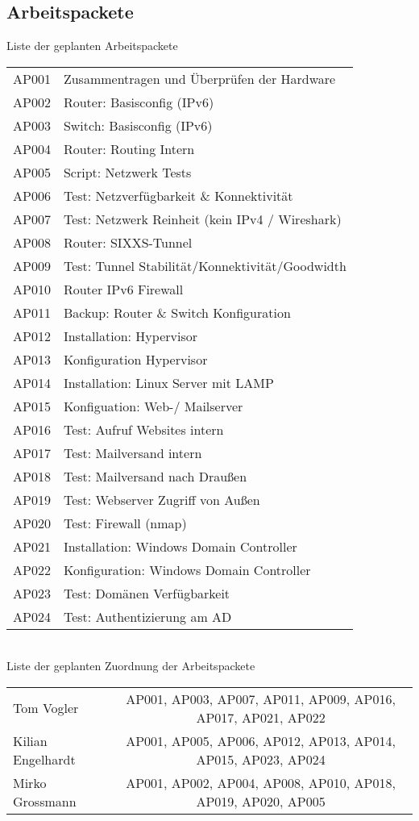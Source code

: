 \subsection{Arbeitspackete}
Liste der geplanten Arbeitspackete\\
\noindent \begin{tabular}{|l|l|}
\hline
AP001 & Zusammentragen und Überprüfen der Hardware \\
AP002 & Router: Basisconfig (IPv6) \\
AP003 & Switch: Basisconfig (IPv6) \\
AP004 & Router: Routing Intern \\
AP005 & Script: Netzwerk Tests \\
AP006 & Test: Netzverfügbarkeit \& Konnektivität \\
AP007 & Test: Netzwerk Reinheit (kein IPv4 / Wireshark) \\
AP008 & Router: SIXXS-Tunnel \\
AP009 & Test: Tunnel Stabilität/Konnektivität/Goodwidth \\
AP010 & Router IPv6 Firewall \\
AP011 & Backup: Router \& Switch Konfiguration \\
AP012 & Installation: Hypervisor \\
AP013 & Konfiguration Hypervisor \\
AP014 & Installation: Linux Server mit LAMP \\
AP015 & Konfiguation: Web-/ Mailserver \\
AP016 & Test: Aufruf Websites intern \\
AP017 & Test: Mailversand intern \\
AP018 & Test: Mailversand nach Draußen \\
AP019 & Test: Webserver Zugriff von Außen \\
AP020 & Test: Firewall (nmap) \\
AP021 & Installation: Windows Domain Controller \\
AP022 & Konfiguration: Windows Domain Controller \\
AP023 & Test: Domänen Verfügbarkeit \\
AP024 & Test: Authentizierung am AD \\
\hline
\end{tabular}
\vspace{0.5cm}\\
Liste der geplanten Zuordnung der Arbeitspackete\\
\noindent \begin{tabular}{|l|c|}
\hline
Tom Vogler & AP001, AP003, AP007, AP011, AP009, AP016, AP017, AP021, AP022 \\
Kilian Engelhardt & AP001, AP005, AP006, AP012, AP013, AP014, AP015, AP023, AP024 \\
Mirko Grossmann & AP001, AP002, AP004, AP008, AP010, AP018, AP019, AP020, AP005 \\
\hline
\end{tabular}

